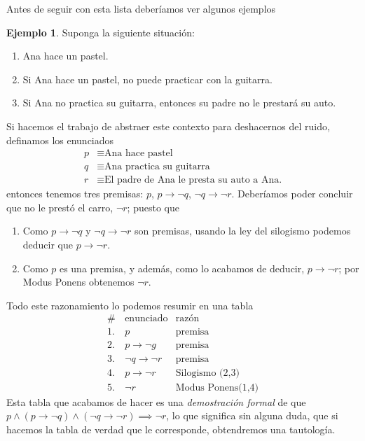 \documentclass{book}
\theoremstyle{definition}
\newtheorem{ejm}{Ejemplo}[chapter]
\begin{document}
Antes de seguir con esta lista deberíamos ver algunos ejemplos
\begin{ejm}
	Suponga la siguiente situación:
	\begin{enumerate}
		\item Ana hace un pastel.
		\item Si Ana hace un pastel, no puede practicar con la guitarra.
		\item Si Ana no practica su guitarra, entonces su padre no le prestará su auto.
	\end{enumerate}
	Si hacemos el trabajo de abstraer este contexto para deshacernos del ruido, definamos los enunciados
	\begin{align*}
		p &\equiv \text{Ana hace pastel}\\
		q &\equiv \text{Ana practica su guitarra}\\
		r &\equiv \text{El padre de Ana le presta su auto a Ana.}
	\end{align*}
	entonces tenemos tres premisas: $p$, $p \rightarrow \neg q$, $\neg q \rightarrow \neg r$. Deberíamos poder concluir que no le prestó el carro, $\neg r$; puesto que
	\begin{enumerate}
		\item Como $p \rightarrow \neg q$ y $\neg q \rightarrow \neg r$ son premisas, usando la ley del silogismo podemos deducir que $p \rightarrow \neg r$.
		\item Como $p$ es una premisa, y además, como lo acabamos de deducir, $p \rightarrow \neg r$; por Modus Ponens obtenemos $\neg r$.
	\end{enumerate}
	Todo este razonamiento lo podemos resumir en una tabla	
	\begin{align*}
		\# \, & \text{enunciado} & \text{razón}\\
		1.& p & \text{premisa} \\
		2.& p \rightarrow \neg g & \text{premisa}\\
		3.& \neg q \rightarrow \neg r & \text{premisa}\\
		4.& p \rightarrow \neg r & \text{Silogismo (2,3)}\\
		5.& \neg r & \text{Modus Ponens(1,4)}
	\end{align*}
	Esta tabla que acabamos de hacer es una \emph{demostración formal} de que
	$p \wedge (p \rightarrow \neg q) \wedge (\neg q \rightarrow \neg r) \implies \neg r$, lo que significa sin alguna duda, que si hacemos la tabla de verdad que le corresponde, obtendremos una tautología.
	

\end{ejm}
\end{document}
